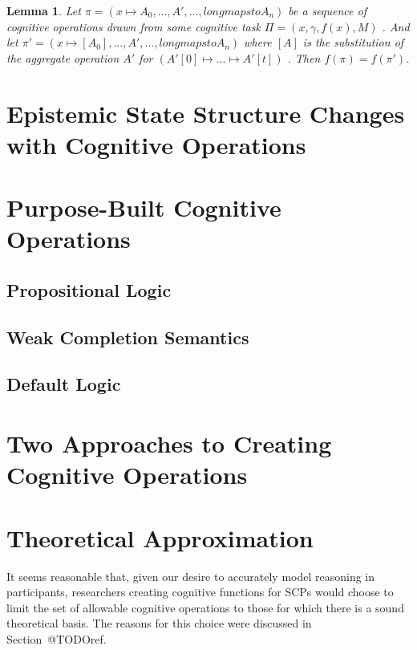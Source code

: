 \documentclass[
11pt, %
english, %
singlespacing, %
headsepline, %
]{MastersDoctoralThesis} %
\newtheorem{lemma}{Lemma}
\begin{document}
\begin{lemma} \label{lemma:substitutionValid}
Let $\pi=(x\longmapsto A_0, ..., A', ..., longmapsto A_n)$ be a sequence of cognitive operations drawn from some cognitive task $\Pi=(x, \gamma, f(x), M)$ . And let $\pi'=(x\longmapsto [A_0], ..., A', ..., longmapsto A_n)$ where $[A]$ is the substitution of the aggregate operation $A'$ for $(A'[0]\longmapsto ... \longmapsto A'[t])$ . Then $f(\pi)=f(\pi')$.
\end{lemma}

\section{Epistemic State Structure Changes with Cognitive Operations}
\section{Purpose-Built Cognitive Operations}
\subsection{Propositional Logic}
\subsection{Weak Completion Semantics}
\subsection{Default Logic}
\section{Two Approaches to Creating Cognitive Operations}
\section{Theoretical Approximation}
It seems reasonable that, given our desire to accurately model reasoning in participants, researchers creating cognitive functions for SCPs would choose to limit the set of allowable cognitive operations to those for which there is a sound theoretical basis. The reasons for this choice were discussed in Section~@TODOref.
\end{document}
